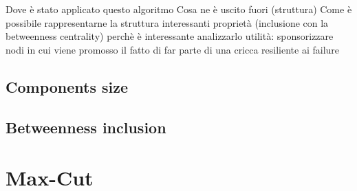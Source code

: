 	
	Dove è stato applicato questo algoritmo
	Cosa ne è uscito fuori (struttura)
	Come è possibile rappresentarne la struttura
	interessanti proprietà (inclusione con la betweenness centrality)
	perchè è interessante analizzarlo
	utilità: sponsorizzare nodi in cui viene promosso il fatto di far parte di una cricca resiliente ai failure
		
	\subsection{Components size}
	\subsection{Betweenness inclusion}
	\section{Max-Cut}
